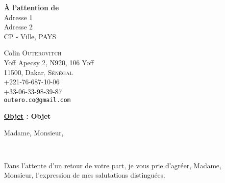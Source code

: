 \documentclass{article}
\begin{document}
\phantom{0}
\vspace{7cm}

\raggedright{
\hspace{3cm}  {\LARGE \textbf{À l’attention de}} \\ \vspace{1cm}
\hspace{3cm}  {\LARGE Adresse 1} \\ \vspace{1cm}
\hspace{3cm}  {\LARGE Adresse 2} \\ \vspace{1cm}
\hspace{3cm}  {\LARGE CP - Ville, PAYS} \\ \vspace{1cm}}

\newpage
\phantom{00}
\newpage

\raggedright{
    Colin \textsc{Outerovitch} \\
    Yoff Apecsy 2, N920, 106 Yoff \\
    11500, Dakar, \textsc{Sénégal} \\
   +221-76-687-10-06 \\
   +33-06-33-98-39-87 \\
    \texttt{outero.co@gmail.com} \\
}


\raggedright{\textbf{\underline{Objet} : Objet}} \bigskip

Madame, Monsieur, \bigskip

\justifying

\lipsum[2] \smallskip

\lipsum[2] \medskip

\lipsum[2] \bigskip

\lipsum[2] \\

\lipsum[2] \smallskip



Dans l’attente d’un retour de votre part, je vous prie
d’agréer, Madame, Monsieur, l’expression de mes salutations
distinguées.

\end{document}

